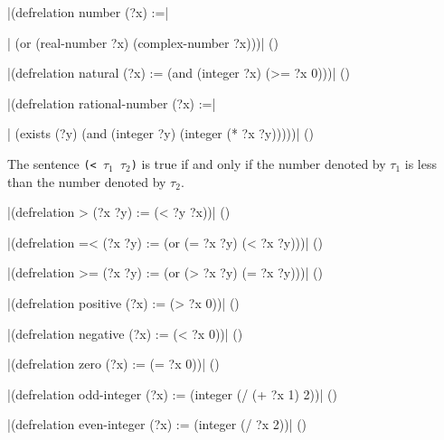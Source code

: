\verbatim|(defrelation number (?x) :=|\par
\verbatim|  (or (real-number ?x) (complex-number ?x)))|
\hfill(\equation)\par
\medskip

\medskip
\verbatim|(defrelation natural (?x) :=  (and (integer ?x) (>= ?x 0)))|
\hfill(\equation)\par
\medskip

\medskip
\verbatim|(defrelation rational-number (?x) :=|\par
\verbatim|  (exists (?y) (and (integer ?y) (integer (* ?x ?y)))))|
\hfill(\equation)\par
\medskip


{The sentence {\tt (< $\tau_1$ $\tau_2$)} is true if and only if the number denoted by
$\tau_1$ is less than the number denoted by $\tau_2$.}

\medskip
\verbatim|(defrelation > (?x ?y) := (< ?y ?x))|
\hfill(\equation)\par 
\medskip

\medskip
\verbatim|(defrelation =< (?x ?y) := (or (= ?x ?y) (< ?x ?y)))|
\hfill(\equation)\par 
\medskip

\medskip
\verbatim|(defrelation >= (?x ?y) := (or (> ?x ?y) (= ?x ?y)))|
\hfill(\equation)\par 
\medskip


\medskip
\verbatim|(defrelation positive (?x) := (> ?x 0))|
\hfill(\equation)\par 
\medskip

\medskip
\verbatim|(defrelation negative (?x) := (< ?x 0))|
\hfill(\equation)\par 
\medskip

\medskip
\verbatim|(defrelation zero (?x) := (= ?x 0))|
\hfill(\equation)\par 
\medskip


\medskip
\verbatim|(defrelation odd-integer (?x) := (integer (/ (+ ?x 1) 2))|
\hfill(\equation)\par 
\medskip

\medskip
\verbatim|(defrelation even-integer (?x) := (integer (/ ?x 2))|
\hfill(\equation)\par 
\medskip


